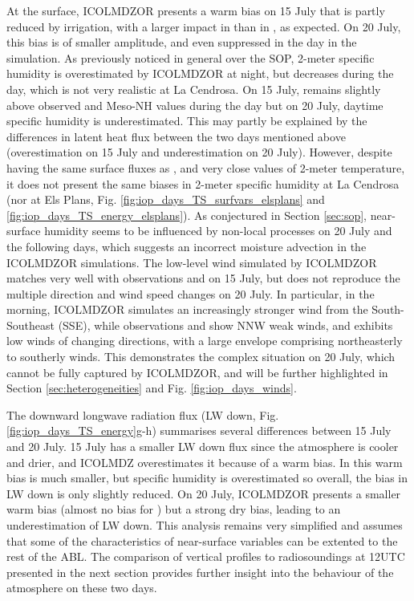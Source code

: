 At the surface, ICOLMDZOR presents a warm bias on 15 July that is partly reduced by irrigation, with a larger impact in \irrboost than in \irr, as expected. On 20 July, this bias is of smaller amplitude, and even suppressed in the day in the \irrboost simulation.
As previously noticed in general over the SOP, 2-meter specific humidity is overestimated by ICOLMDZOR at night, but decreases during the day, which is not very realistic at La Cendrosa. On 15 July, \irrboost remains slightly above observed and Meso-NH values during the day but on 20 July, daytime specific humidity is underestimated.
This may partly be explained by the differences in latent heat flux between the two days mentioned above (overestimation on 15 July and underestimation on 20 July).
However, despite \mesomean having the same surface fluxes as \irrboost, and very close values of 2-meter temperature, it does not present the same biases in 2-meter specific humidity at La Cendrosa (nor at Els Plans, Fig. \ref{fig:iop_days_TS_surfvars_elsplans} and \ref{fig:iop_days_TS_energy_elsplans}).
As conjectured in Section \ref{sec:sop}, near-surface humidity seems to be influenced by non-local processes on 20 July and the following days, which suggests an incorrect moisture advection in the ICOLMDZOR simulations. 
The low-level wind simulated by ICOLMDZOR matches very well with observations and \mesomean on 15 July, but does not reproduce the multiple direction and wind speed changes on 20 July. In particular, in the morning, ICOLMDZOR simulates an increasingly stronger wind from the South-Southeast (SSE), while observations and \mesoexact show NNW weak winds, and \mesomean exhibits low winds of changing directions, with a large envelope comprising northeasterly to southerly winds. This demonstrates the complex situation on 20 July, which cannot be fully captured by ICOLMDZOR, and will be further highlighted in Section \ref{sec:heterogeneities} and Fig. \ref{fig:iop_days_winds}.

The downward longwave radiation flux (LW down, Fig. \ref{fig:iop_days_TS_energy}g-h) summarises several differences between 15 July and 20 July. 
15 July has a smaller LW down flux since the atmosphere is cooler and drier, and ICOLMDZ overestimates it because of a warm bias. In \irrboost this warm bias is much smaller, but specific humidity is overestimated so overall, the bias in LW down is only slightly reduced. 
On 20 July, ICOLMDZOR presents a smaller warm bias (almost no bias for \irrboost) but a strong dry bias, leading to an underestimation of LW down. 
This analysis remains very simplified and assumes that some of the characteristics of near-surface variables can be extented to the rest of the ABL. The comparison of vertical profiles to radiosoundings at 12UTC presented in the next section provides further insight into the behaviour of the atmosphere on these two days.

